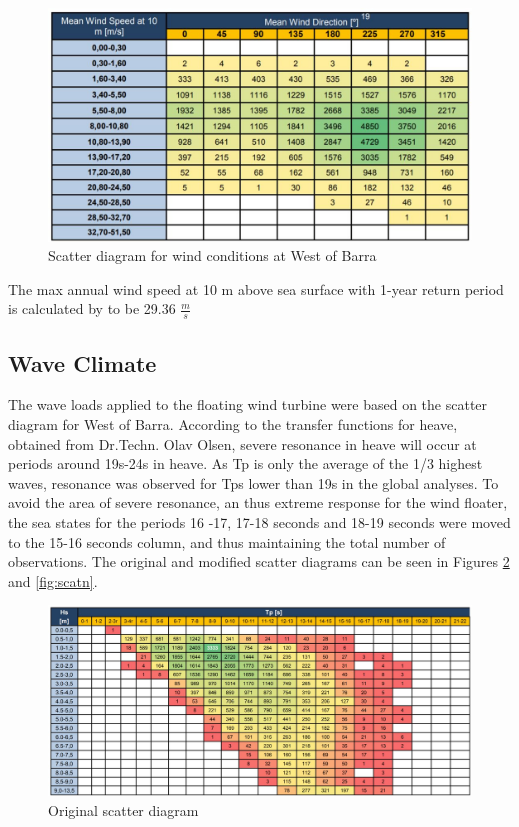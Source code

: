 \begin{figure}[H]
\centering
\includegraphics[scale=0.7]{figures/scatterwind}
\caption[$\; \:$Scatter diagram for wind conditions]{Scatter diagram for wind conditions at West of Barra \cite{Lifes50+D1.1} }
 \label{fig:scatterwind}
\end{figure}
 
 \noindent The max annual wind speed at 10 m above sea surface with 1-year return period is calculated by \cite{Lifes50+D1.1} to be  29.36 $\frac{m}{s}$



\subsection{Wave Climate}
The wave loads applied to the floating wind turbine were based on the scatter diagram for West of Barra. According to the transfer functions for heave, obtained from Dr.Techn. Olav Olsen, severe resonance in heave will occur at periods around 19s-24s in heave. As Tp is only the average of the 1/3 highest waves, resonance was observed for Tps lower than 19s in the global analyses. To avoid the area of severe resonance, an thus extreme response for the wind floater, the sea states for the periods 16 -17, 17-18 seconds and 18-19 seconds were moved to the 15-16 seconds column, and thus maintaining the total number of observations. The original and modified scatter diagrams can be seen in Figures \ref{fig:scato} and \ref{fig:scatn}.

\begin{figure}[H]
\centering
\includegraphics[scale=0.5]{figures/scatteroriginal}
\caption[$\; \:$Original scatter diagram]{Original scatter diagram \cite{Lifes50+D1.1} }
 \label{fig:scato}
\end{figure}

